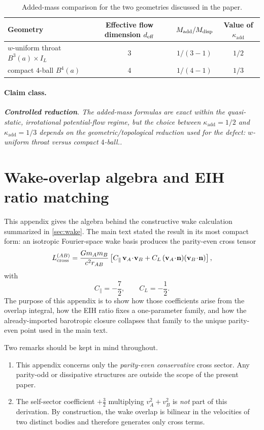 \documentclass[11pt]{article}
\newcommand{\vct}{\mathbf v}
\newcommand{\nvec}{\mathbf n}
\newcommand{\kadd}{\kappa_{\mathrm{add}}}
\newcommand{\Cpara}{C_{\parallel}}
\newcommand{\CLong}{C_{L}}
\newcommand{\Controlled}{\textbf{Controlled reduction}}
\newcommand{\claimclass}[1]{\paragraph{Claim class.}\emph{#1.}}
\begin{document}
\begin{table}[H]
  \centering
  \caption{Added-mass comparison for the two geometries discussed in the paper.}
  \label{tab:app-added-mass-comparison}
  \small
  \renewcommand{\arraystretch}{1.15}
  \begin{tabularx}{\linewidth}{@{}L c c c@{}}
    \toprule
    Geometry & Effective flow dimension \(d_{\rm eff}\) & \(M_{\rm add}/M_{\rm disp}\) & Value of \(\kadd\) \\
    \midrule
    \(w\)-uniform throat \(B^3(a)\times I_L\) & \(3\) & \(1/(3-1)\) & \(1/2\) \\
    compact \(4\)-ball \(B^4(a)\) & \(4\) & \(1/(4-1)\) & \(1/3\) \\
    \bottomrule
  \end{tabularx}
\end{table}

\claimclass{\Controlled. The added-mass formulas are exact within the quasi-static,
irrotational potential-flow regime, but the choice between \(\kadd=1/2\) and
\(\kadd=1/3\) depends on the geometric/topological reduction used for the defect:
\(w\)-uniform throat versus compact \(4\)-ball.}

\section{Wake-overlap algebra and EIH ratio matching}
\label{app:wake}

This appendix gives the algebra behind the constructive wake calculation summarized in
\cref{sec:wake}. The main text stated the result in its most compact form:
an isotropic Fourier-space wake basis produces the parity-even cross tensor
\begin{equation}
L_{\rm cross}^{(AB)}
=
\frac{Gm_A m_B}{c^2 r_{AB}}
\left[
\Cpara\,\vct_A\!\cdot\!\vct_B
+
\CLong\,(\vct_A\!\cdot\!\nvec)(\vct_B\!\cdot\!\nvec)
\right],
\end{equation}
with
\begin{equation}
\Cpara=-\frac72,
\qquad
\CLong=-\frac12.
\end{equation}
The purpose of this appendix is to show how those coefficients arise from the overlap
integral, how the EIH ratio fixes a one-parameter family, and how the already-imported
barotropic closure collapses that family to the unique parity-even point used in the main
text.

Two remarks should be kept in mind throughout.
\begin{enumerate}[leftmargin=1.5em]
  \item This appendix concerns only the \emph{parity-even conservative} cross sector.
  Any parity-odd or dissipative structures are outside the scope of the present paper.
  \item The self-sector coefficient \(+\frac32\) multiplying \(v_A^2+v_B^2\) is
  \emph{not} part of this derivation. By construction, the wake overlap is bilinear in the
  velocities of two distinct bodies and therefore generates only cross terms.
\end{enumerate}
\end{document}
